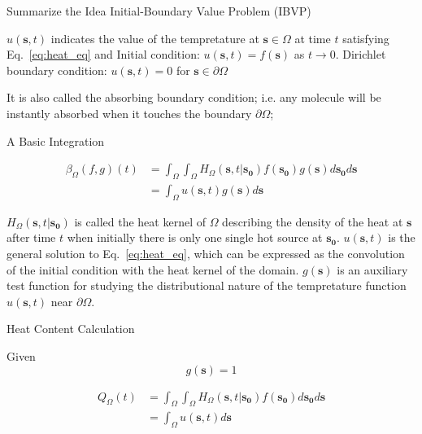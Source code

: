 \documentclass{article}
\begin{document}
\begin{outline}[enumerate]
    \2 Summarize the Idea
      \3 Initial-Boundary Value Problem (IBVP)
        \par
        $u(\bm{s}, t)$ indicates the value of the tempretature at $\bm{s} \in \Omega$ at time $t$ satisfying Eq.~\ref{eq:heat_eq} and 
         \4 Initial condition: $u(\bm{s}, t) = f(\bm{s})$ as $t \rightarrow 0$.
         \4 Dirichlet boundary condition: $u(\bm{s}, t)=0$ for $\bm{s} \in \partial \Omega$
         \par
          It is also called the absorbing boundary condition; i.e. any molecule will be instantly absorbed when it touches the boundary $\partial \Omega$;


      \3 A Basic Integration
         \par
          \begin{align}
            \beta_{\Omega}(f, g)(t) &= \int_{\Omega} \int_{\Omega} H_{\Omega}(\bm{s}, t | \bm{s_0}) f(\bm{s_0}) g(\bm{s}) d\bm{s_0} d\bm{s} \label{eq:integral_full} \\
            &= \int_{\Omega} u(\bm{s}, t) g(\bm{s}) d\bm{s} \label{eq:integral_convol}
          \end{align}
         
        \4 $H_{\Omega}(\bm{s}, t | \bm{s_0})$ is called the heat kernel of $\Omega$ describing the density of the heat at $\bm{s}$ after time $t$ when initially there is only one single hot source at $\bm{s_0}$. 
        \4 $u(\bm{s}, t)$ is the general solution to Eq.~\ref{eq:heat_eq}, which can be expressed as the convolution of the initial condition with the heat kernel of the domain.
        \4 $g(\bm{s})$ is an auxiliary test function for studying the distributional nature of the tempretature function $u(\bm{s}, t)$ near $\partial \Omega$. 

     \3 Heat Content Calculation
       \par
       Given 
       \begin{equation}\label{eq:g}
         g(\bm{s}) = 1  
       \end{equation}

       \begin{align}
         Q_{\Omega}(t) &= \int_{\Omega} \int_{\Omega} H_{\Omega}(\bm{s}, t | \bm{s_0}) f(\bm{s_0})  d\bm{s_0} d\bm{s} \label{eq:heat_content_integral_full} \\
            &= \int_{\Omega} u(\bm{s}, t) d\bm{s} \label{eq:heat_content_integral_convol}
       \end{align}
       
          
        

\end{outline}
\end{document}

